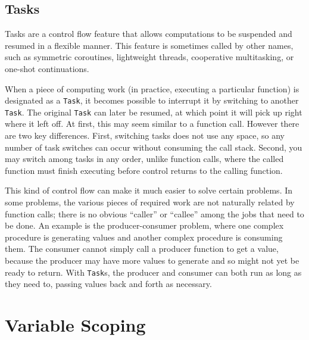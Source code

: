 \documentclass{article}
\renewcommand{\sec}[1]{\label{sec:#1}}
\begin{document}

\subsection{Tasks}\sec{tasks}

Tasks are a control flow feature that allows computations to be suspended
and resumed in a flexible manner. This feature is sometimes called by other
names, such as symmetric coroutines, lightweight threads,
cooperative multitasking, or one-shot continuations.

When a piece of computing work (in practice, executing a particular function)
is designated as a \verb|Task|, it becomes possible to interrupt it by
switching to another \verb|Task|. The original \verb|Task| can later be
resumed, at which point it will pick up right where it left off. At first,
this may seem similar to a function call. However there are two key
differences. First, switching tasks does not use any space, so any number
of task switches can occur without consuming the call stack. Second, you
may switch among tasks in any order, unlike function calls, where the called
function must finish executing before control returns to the calling
function.

This kind of control flow can make it much easier to solve certain problems.
In some problems, the various pieces of required work are not naturally
related by function calls; there is no obvious ``caller''
or ``callee'' among the jobs that need to be done. An example is the
producer-consumer problem, where one complex procedure is generating values
and another complex procedure is consuming them. The consumer cannot simply
call a producer function to get a value, because the producer may have
more values to generate and so might not yet be ready to return. With
\verb|Task|s, the producer and consumer can both run as long as they need to,
passing values back and forth as necessary.

\section{Variable Scoping}\sec{variable-scoping}
\end{document}
